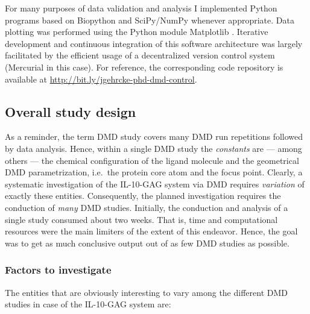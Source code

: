 For many purposes of data validation and analysis I implemented Python
programs based on Biopython \cite{biopython_web} and SciPy/NumPy
\cite{scipy_numpy} whenever appropriate. Data plotting was performed using
the Python module Matplotlib \cite{matplotlib_web}. Iterative development and
continuous integration of this software architecture was largely facilitated by
the efficient usage of a decentralized version control system (Mercurial
\cite{mercurial_web} in this case). For reference, the corresponding code
repository is available at \url{http://bit.ly/jgehrcke-phd-dmd-control}.


\subsection{Overall study design}
\label{dmdil10:overallmethod}

As a reminder, the term DMD study covers many DMD run repetitions followed by
data analysis. Hence, within a single DMD study the \textit{constants} are ---
among others --- the chemical configuration of the ligand molecule and the
geometrical DMD parametrization, i.e.\ the protein core atom and the focus
point. Clearly, a systematic investigation of the IL-10-GAG system via DMD
requires \textit{variation} of exactly these entities. Consequently, the planned
investigation requires the conduction of \textit{many} DMD studies. Initially,
the conduction and analysis of a single study consumed about two weeks. That is,
time and computational resources were the main limiters of the extent of this
endeavor. Hence, the goal was to get as much conclusive output out of as few DMD
studies as possible.

\subsubsection{Factors to investigate}

The entities that are obviously interesting to vary among the different DMD
studies in case of the IL-10-GAG system are:

